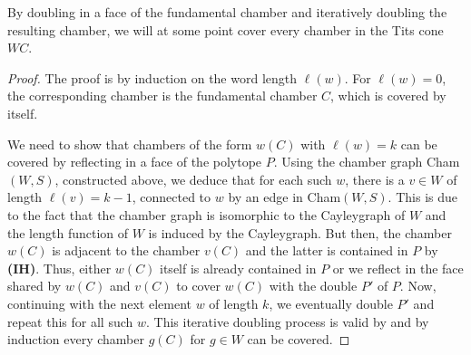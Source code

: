 \begin{theorem}
    By doubling in a face of the fundamental chamber and iteratively doubling the resulting chamber, we will at some point cover every chamber in the Tits cone \(WC\).
\end{theorem}
\begin{proof}
    The proof is by induction on the word length \(\ell(w)\).
    For \(\ell(w) = 0\), the corresponding chamber is the fundamental chamber \(C\), which is covered by itself.
    \par\noindent
    We need to show that chambers of the form \(w(C)\) with \(\ell(w) = k\) can be covered by reflecting in a face of the polytope \(P\).
    Using the chamber graph Cham\((W, S)\), constructed above, we deduce that for each such \(w\), there is a \(v \in W\) of length \(\ell(v) = k - 1\), connected to \(w\) by an edge in Cham\((W, S)\). %
    This is due to the fact that the chamber graph is isomorphic to the Cayleygraph of  \(W\) and the length function of \(W\) is induced by the Cayleygraph.
    But then, the chamber \(w(C)\) is adjacent to the chamber \(v(C)\) and the latter is contained in \(P\) by \textbf{(IH)}.
    Thus, either \(w(C)\) itself is already contained in \(P\) or we reflect in the face shared by \(w(C)\) and \(v(C)\) to cover \(w(C)\) with the double \(P'\) of \(P\).
    Now, continuing with the next element \(w\) of length \(k\), we eventually double \(P'\) and repeat this for all such \(w\).
    This iterative doubling process is valid by  and by induction every chamber \(g(C)\) for \(g \in W\) can be covered.
\end{proof}

